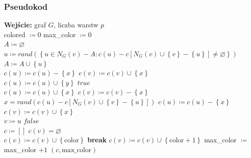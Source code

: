 \documentclass[10pt,a4paper]{article}
\begin{document}
	\subsubsection{Pseudokod}
	
	\begin{algorithmic}
		\State \textbf{Wejście:} graf $G$, liczba warstw $p$ \\
		\State colored $\coloneqq 0$
		\State max\_color $\coloneqq 0$
		\\
			\State $A \coloneqq \varnothing$
			\\
				\State $u \coloneqq rand(\left\{u \in N_{G}(v) - A : c(u) - c[N_{G}(v) \cup \left\{v\right\} - \left\{u\right\}] \neq \varnothing \right\})$
				\State $A \coloneqq A \cup \left\{u\right\}$
				\\
					\State $c(u) \coloneqq c(u) - \left\{x\right\}$
					\State $c(v) \coloneqq c(v) \cup \left\{x\right\}$
					\\
							\State $c(u) \coloneqq c(u) \cup \left\{y\right\}$
							\State \Return $true$
						\EndIf
					\EndFor
					\\
					\State $c(u) \coloneqq c(u) \cup \left\{x\right\}$
					\State $c(v) \coloneqq c(v) - \left\{x\right\}$
				\EndFor
				\\
				\State $x = rand(c(u) - c[N_{G}(v) \cup \left\{v\right\} - \left\{u\right\}])$
				\State $c(u) \coloneqq c(u) - \left\{x\right\}$
				\State $c(v) \coloneqq c(v) \cup \left\{x\right\}$
				\\
				\State $v \coloneqq u$
			\EndFor
			\State \Return $false$
		\EndProcedure
		\\
			\State $c \coloneqq \left[\right]$
				\State $c(v) = \varnothing$
			\EndFor
			\\
						\State $c(v) \coloneqq c(v) \cup \left\{\text{color}\right\}$
						\State \textbf{break}
					\EndIf
				\EndFor
					\State $c(v) \coloneqq c(v) \cup \left\{\text{color} + 1\right\}$
					\State max\_color $\coloneqq$ max\_color $+ 1$
				\EndIf
			\EndFor
			\State \Return $(c, \text{max\_color})$
		\EndFunction
	\end{algorithmic}	
	
\end{document}
